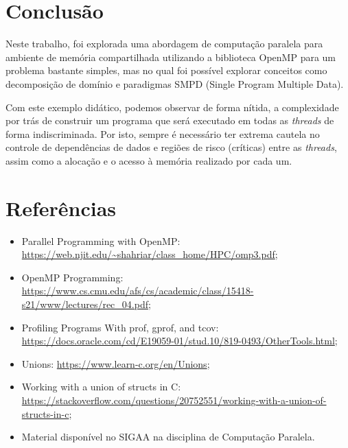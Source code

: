 \documentclass[a4paper, 12pt]{article}
\begin{document}
\section{Conclusão}

Neste trabalho, foi explorada uma abordagem de computação paralela para ambiente de memória compartilhada utilizando a biblioteca OpenMP para um problema bastante simples, mas no qual foi possível explorar conceitos como decomposição de domínio e paradigmas SMPD (Single Program Multiple Data).

Com este exemplo didático, podemos observar de forma nítida, a complexidade por trás de construir um programa que será executado em todas as \emph{threads} de forma indiscriminada. Por isto, sempre é necessário ter extrema cautela no controle de dependências de dados e regiões de risco (críticas) entre as \emph{threads}, assim como a alocação e o acesso à memória realizado por cada um.

\pagebreak
\section*{Referências}

\begin{itemize}
    \item Parallel Programming with OpenMP: \url{https://web.njit.edu/~shahriar/class_home/HPC/omp3.pdf};
    \item OpenMP Programming: \url{https://www.cs.cmu.edu/afs/cs/academic/class/15418-s21/www/lectures/rec_04.pdf};
    \item Profiling Programs With prof, gprof, and tcov: \url{https://docs.oracle.com/cd/E19059-01/stud.10/819-0493/OtherTools.html};
    \item Unions: \url{https://www.learn-c.org/en/Unions};
    \item Working with a union of structs in C: \url{https://stackoverflow.com/questions/20752551/working-with-a-union-of-structs-in-c};
    \item Material disponível no SIGAA na disciplina de Computação Paralela.
\end{itemize}
\end{document}
